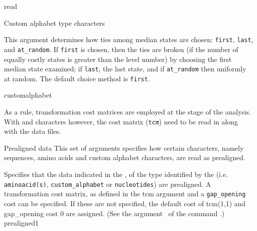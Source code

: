 \begin{command}{read}{}
\begin{arguments}
\begin{argumentgroup}{Custom alphabet type characters}
{\begin{description}
                     {\obligatory \poylident}
                        {This argument determines how ties among median states are chosen: \texttt{first}, \texttt{last}, 
                        and \texttt{at\_random}.  If \texttt{first} is chosen,     then the ties are broken (if the number of 
                        equally costly states is greater than the level number) by choosing the first median state examined; 
                        if \texttt{last}, the last state, and if \texttt{at\_random} then uniformly at random. The default choice method is \texttt{first}.}
                        {}
                        
                \end{description}

                }
                {customalphabet}
     
        \end{argumentgroup}

        \begin{statement}
            As a rule, transformation cost matrices are employed at the  stage of the
            analysis.  With  and  characters however, 
            the cost matrix (\texttt{tcm}) need to  be read in along with the data files.
        \end{statement}

        \begin{argumentgroup}{Prealigned data}
            This set of arguments specifies how certain characters, namely sequences,
            amino acids and custom alphabet characters, are read as prealigned.
    
                {Specifies that the data indicated in the \poystring, of the type identified by the \poylident (i.e. 
                \texttt{aminoacid(s)}, \texttt{custom\_alphabet} or \texttt{nucleotides}) are prealigned.
                A transformation cost matrix, as defined in the tcm \poystring argument and a \texttt{gap\_opening}
                cost can be specified.  If these are not specified, the default cost of tcm(1,1) and gap\_opening
                cost $ 0 $ are assigned. (See the argument~ 
                of the command .)}
                {prealigned1}
            

\end{argumentgroup}
\end{arguments}
\end{command}
